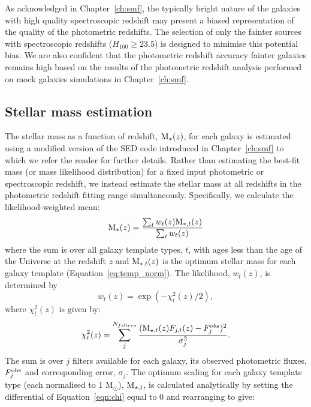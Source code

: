 As acknowledged in Chapter~\ref{ch:smf}, the typically bright nature of the galaxies with high quality spectroscopic redshift may present a biased representation of the quality of the photometric redshifts. The selection of only the fainter sources with spectroscopic redshifts ($H_{160} \geq 23.5$) is designed to minimise this potential bias. We are also confident that the photometric redshift accuracy fainter galaxies remains high based on the results of the photometric redshift analysis performed on mock galaxies simulations in Chapter~\ref{ch:smf}.

\subsection{Stellar mass estimation}\label{merger-sec:stellarmass}
The stellar mass as a function of redshift, $\textup{M}_{*} (z)$, for each galaxy is estimated using a modified version of the SED code introduced in Chapter~\ref{ch:smf} to which we refer the reader for further details. Rather than estimating the best-fit mass (or mass likelihood distribution) for a fixed input photometric or spectroscopic redshift, we instead estimate the stellar mass at all redshifts in the photometric redshift fitting range simultaneously. Specifically, we calculate the likelihood-weighted mean:
\begin{equation}
	\textup{M}_{*} (z) = \frac{\sum_{t}^{} w_{t}(z) \text{M}_{*,t}(z)} {\sum_{t} w_{t}(z)}
\end{equation}
where the sum is over all galaxy template types, $t$, with ages less than the age of the Universe at the redshift $z$ and $\textup{M}_{\star,t}(z)$ is the optimum stellar mass for each galaxy template (Equation~\ref{eq:temp_norm}). The likelihood, $w_{t}(z)$, is determined by
\begin{equation}
	w_{t}(z) = \exp(-\chi_{t}^{2}(z)/2),	
\end{equation}
where $\chi^{2}_{t}(z)$ is given by:
\begin{equation}\label{eqn:chi}
  \chi^{2}_{t}(z) = \sum_{j}^{N_{filters}} \frac{(\textup{M}_{\star,t}(z) F_{j,t}(z) - F_{j}^{obs})^2} {\sigma_{j}^{2}}.
\end{equation}
The sum is over $j$ filters available for each galaxy, its observed photometric fluxes, $F_{j}^{\textup{obs}}$ and corresponding error, $\sigma_{j}$. The optimum scaling for each galaxy template type (each normalised to 1 M$_{\odot}$), $\textup{M}_{\star,t}$, is calculated analytically by setting the differential of Equation~\ref{eqn:chi} equal to 0 and rearranging to give:
